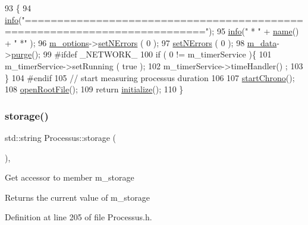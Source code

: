\begin{DoxyCode}
93                                       \{
94   \hyperlink{classObject_a644fd329ea4cb85f54fa6846484b84a8}{info}(\textcolor{stringliteral}{"=========================================================================="});
95   \hyperlink{classObject_a644fd329ea4cb85f54fa6846484b84a8}{info}(\textcolor{stringliteral}{"   * "} + \hyperlink{classObject_a300f4c05dd468c7bb8b3c968868443c1}{name}() + \textcolor{stringliteral}{" *"} );
96   \hyperlink{classProcessus_a74205f3c1e00c4448f7b3257c2351797}{m\_options}->\hyperlink{classOptions_a45368b495036869c67fe0e6bf9abc4e6}{setNErrors} ( 0 );
97   \hyperlink{classProcessus_a831b027b9cf18ab56fa6147b5d3055da}{setNErrors} ( 0 );
98   \hyperlink{classProcessus_a3da9a9de8af54e2f47807a3e09dfccff}{m\_data}->\hyperlink{classData_a26209d56fdc86a72ae391fcd3bd2adfd}{purge}();
99 \textcolor{preprocessor}{#ifdef \_NETWORK\_}
100   \textcolor{keywordflow}{if} ( 0 != m\_timerService )\{
101     m\_timerService->setRunning ( \textcolor{keyword}{true} );
102     m\_timerService->timeHandler() ;
103   \}
104 \textcolor{preprocessor}{#endif}
105   \textcolor{comment}{// start measuring processus duration}
106   
107   \hyperlink{classProcessus_a5e4d34b86241fa0756e07375a14ff4b2}{startChrono}();
108   \hyperlink{classProcessus_aacf6812880c1d1a2bf14a4a39458f443}{openRootFile}();
109   \textcolor{keywordflow}{return} \hyperlink{classProcessus_aee88ad7b77ae7319cf8b128e9dd2ea11}{initialize}();
110 \}
\end{DoxyCode}
\mbox{\label{classProcessus_a33fa1a0b54a636e5cdd680669fd9ea51}} 
\subsubsection{\texorpdfstring{storage()}{storage()}}
{\footnotesize\ttfamily std\+::string Processus\+::storage (\begin{DoxyParamCaption}{ }\end{DoxyParamCaption})\hspace{0.3cm}{\ttfamily [inline]}, {\ttfamily [inherited]}}

Get accessor to member m\+\_\+storage \begin{DoxyReturn}{Returns}
the current value of m\+\_\+storage 
\end{DoxyReturn}


Definition at line 205 of file Processus.\+h.



